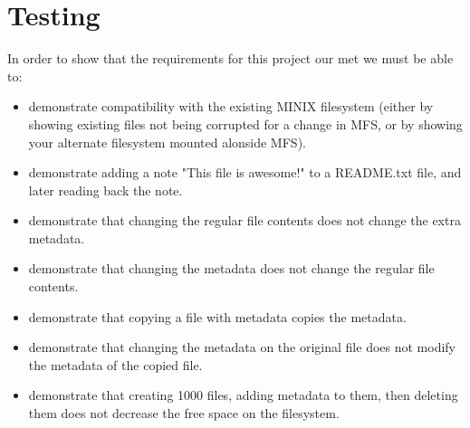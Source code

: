 \documentclass[paper=a4, fontsize=11pt]{scrartcl}
\numberwithin{equation}{section} %
\numberwithin{figure}{section} %
\numberwithin{table}{section} %
\begin{document}
\section{Testing}
In order to show that the requirements for this project our met we must be able to:
	\begin{itemize}
		\item demonstrate compatibility with the existing MINIX filesystem (either by showing  existing files not being corrupted for a change in MFS, or by showing your alternate filesystem mounted alonside MFS).
		\item demonstrate adding a note "This file is awesome!" to a README.txt file, and later 
reading back the note.
		\item demonstrate that changing the regular file contents does not change the extra 
metadata.
		\item demonstrate that changing the metadata does not change the regular file contents.
		\item demonstrate that copying a file with metadata copies the metadata.
		\item demonstrate that changing the metadata on the original file does not modify the 
metadata of the copied file. 
		\item demonstrate that creating 1000 files, adding metadata to them, then deleting them 
does not decrease the free space on the filesystem.
	\end{itemize}
\end{document}
